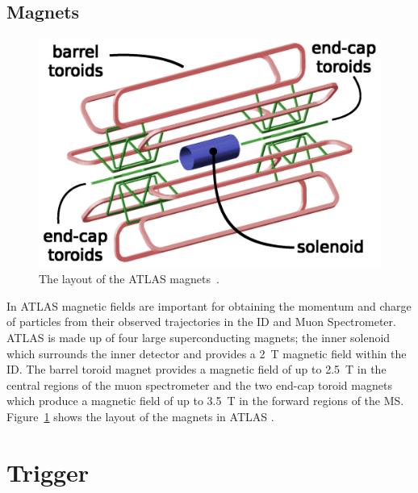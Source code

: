 \subsection{Magnets}
\label{sec:det-magnets}

\begin{figure}[!ht]
  \begin{center}
    \includegraphics[width=1\linewidth, angle=0]{figs/Detector/Magnet_schem.png}
  \end{center}
  \caption[The layout of the ATLAS magnets.]{The layout of the ATLAS magnets~\cite{det-magnet_fig}.}
  \label{fig:det-magnet_schem}
\end{figure}


In ATLAS magnetic fields are important for obtaining the momentum and charge of particles from their observed trajectories in the ID and Muon Spectrometer.
ATLAS is made up of four large superconducting magnets;
the inner solenoid which surrounds the inner detector and provides a 2~T magnetic field within the ID.
The barrel toroid magnet provides a magnetic field of up to 2.5~T in the central regions of the muon spectrometer and
the two end-cap toroid magnets which produce a magnetic field of up to 3.5~T in the forward regions of the MS.
Figure~\ref{fig:det-magnet_schem} shows the layout of the magnets in ATLAS \cite{det-magnet_fig}.

\section{Trigger}
\label{sec:det-trig}

